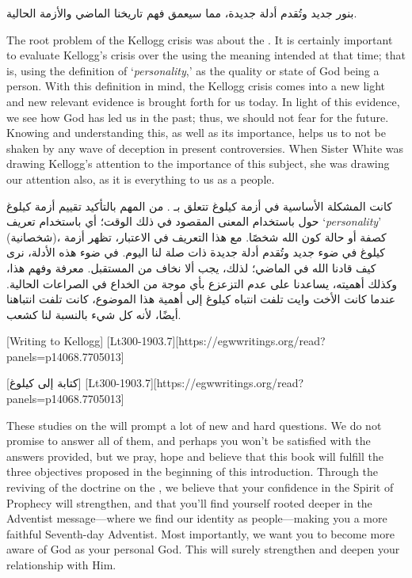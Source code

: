 بنور جديد وتُقدم أدلة جديدة، مما سيعمق فهم تاريخنا الماضي والأزمة الحالية.


The root problem of the Kellogg crisis was about the . It is certainly important to evaluate Kellogg's crisis over the  using the meaning intended at that time; that is, using the definition of ‘\textit{personality},’ as the quality or state of God being a person. With this definition in mind, the Kellogg crisis comes into a new light and new relevant evidence is brought forth for us today. In light of this evidence, we see how God has led us in the past; thus, we should not fear for the future. Knowing and understanding this, as well as its importance, helps us to not be shaken by any wave of deception in present controversies. When Sister White was drawing Kellogg’s attention to the importance of this subject, she was drawing our attention also, as it is everything to us as a people.


كانت المشكلة الأساسية في أزمة كيلوغ تتعلق بـ . من المهم بالتأكيد تقييم أزمة كيلوغ حول  باستخدام المعنى المقصود في ذلك الوقت؛ أي باستخدام تعريف ‘\textit{personality}’ (شخصانية)، كصفة أو حالة كون الله شخصًا. مع هذا التعريف في الاعتبار، تظهر أزمة كيلوغ في ضوء جديد وتُقدم أدلة جديدة ذات صلة لنا اليوم. في ضوء هذه الأدلة، نرى كيف قادنا الله في الماضي؛ لذلك، يجب ألا نخاف من المستقبل. معرفة وفهم هذا، وكذلك أهميته، يساعدنا على عدم التزعزع بأي موجة من الخداع في الصراعات الحالية. عندما كانت الأخت وايت تلفت انتباه كيلوغ إلى أهمية هذا الموضوع، كانت تلفت انتباهنا أيضًا، لأنه كل شيء بالنسبة لنا كشعب.


[Writing to Kellogg] [Lt300-1903.7][https://egwwritings.org/read?panels=p14068.7705013]


[كتابة إلى كيلوغ] [Lt300-1903.7][https://egwwritings.org/read?panels=p14068.7705013]


These studies on the  will prompt a lot of new and hard questions. We do not promise to answer all of them, and perhaps you won’t be satisfied with the answers provided, but we pray, hope and believe that this book will fulfill the three objectives proposed in the beginning of this introduction. Through the reviving of the doctrine on the , we believe that your confidence in the Spirit of Prophecy will strengthen, and that you’ll find yourself rooted deeper in the Adventist message—where we find our identity as people—making you a more faithful Seventh-day Adventist. Most importantly, we want you to become more aware of God as your personal God. This will surely strengthen and deepen your relationship with Him.


